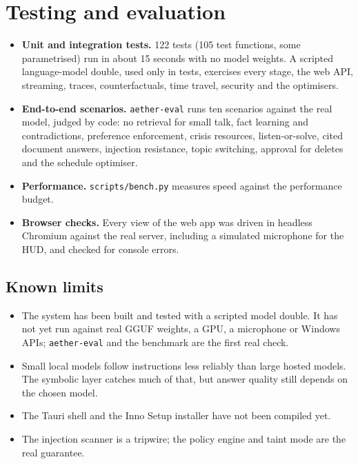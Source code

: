 \documentclass[11pt,a4paper]{article}
\newcommand{\code}[1]{\texttt{#1}}
\begin{document}
\section{Testing and evaluation}
\begin{itemize}
  \item \textbf{Unit and integration tests.} 122 tests (105 test functions, some parametrised) run in about 15 seconds with no model weights. A scripted language-model double, used only in tests, exercises every stage, the web API, streaming, traces, counterfactuals, time travel, security and the optimisers.
  \item \textbf{End-to-end scenarios.} \code{aether-eval} runs ten scenarios against the real model, judged by code: no retrieval for small talk, fact learning and contradictions, preference enforcement, crisis resources, listen-or-solve, cited document answers, injection resistance, topic switching, approval for deletes and the schedule optimiser.
  \item \textbf{Performance.} \code{scripts/bench.py} measures speed against the performance budget.
  \item \textbf{Browser checks.} Every view of the web app was driven in headless Chromium against the real server, including a simulated microphone for the HUD, and checked for console errors.
\end{itemize}

\subsection*{Known limits}
\begin{itemize}
  \item The system has been built and tested with a scripted model double. It has not yet run against real GGUF weights, a GPU, a microphone or Windows APIs; \code{aether-eval} and the benchmark are the first real check.
  \item Small local models follow instructions less reliably than large hosted models. The symbolic layer catches much of that, but answer quality still depends on the chosen model.
  \item The Tauri shell and the Inno Setup installer have not been compiled yet.
  \item The injection scanner is a tripwire; the policy engine and taint mode are the real guarantee.
\end{itemize}

\end{document}
